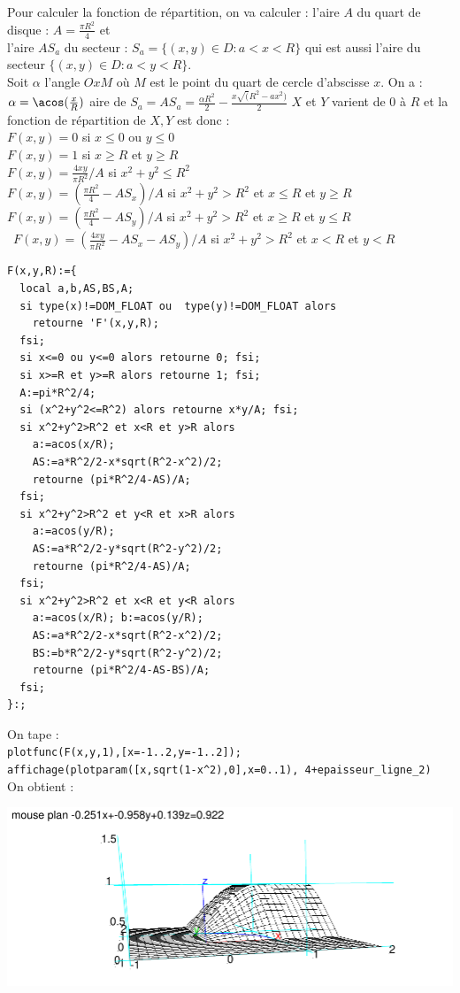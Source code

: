 \documentclass[a4paper,11pt]{book}
\begin{document}
Pour calculer la fonction de r\'epartition, on va calculer :
 l'aire $A$ du quart de disque : $A=\frac{\pi R^2}{4}$ et\\
l'aire $AS_a$ du secteur :
$S_a=\{(x,y)\in D : a<x<R\}$ qui est aussi l'aire du secteur 
$\{(x,y)\in D : a<y<R\}$.\\
Soit $\alpha$ l'angle $OxM$ o\`u $M$ est le point du quart de cercle d'abscisse 
$x$. 
On a :
 $\alpha=\acos(\frac{x}{R})$
 aire de $S_a=AS_a=\frac{\alpha R^2}{2}-\frac{x\sqrt(R^2-ax^2)}{2}$
$X$ et $Y$ varient de 0 \`a $R$ et la fonction de r\'epartition de $X,Y$ est 
donc :\\
$F(x,y)=0$ si $x\leq 0$ ou $y\leq 0$\\ 
$F(x,y)=1$ si $x\geq R$ et $y\geq R$\\ 
$F(x,y)=\frac{4xy}{\pi R^2}/A$ si $x^2+y^2\leq R^2$ \\ 
$F(x,y)=(\frac{\pi R^2}{4}-AS_x)/A$ si $x^2+y^2> R^2$ et $x\leq R$ et $y\geq R$\\ 
$F(x,y)=(\frac{\pi R^2}{4}-AS_y)/A$ si $x^2+y^2> R^2$ et $x\geq R$ et $y\leq R$\\\ 
$F(x,y)=(\frac{4xy}{\pi R^2}-AS_x-AS_y)/A$ si $x^2+y^2> R^2$ et $x<R$ et $y<R$
\begin{verbatim}
F(x,y,R):={
  local a,b,AS,BS,A;
  si type(x)!=DOM_FLOAT ou  type(y)!=DOM_FLOAT alors 
    retourne 'F'(x,y,R); 
  fsi;
  si x<=0 ou y<=0 alors retourne 0; fsi;
  si x>=R et y>=R alors retourne 1; fsi;
  A:=pi*R^2/4;
  si (x^2+y^2<=R^2) alors retourne x*y/A; fsi;
  si x^2+y^2>R^2 et x<R et y>R alors 
    a:=acos(x/R); 
    AS:=a*R^2/2-x*sqrt(R^2-x^2)/2;
    retourne (pi*R^2/4-AS)/A; 
  fsi;
  si x^2+y^2>R^2 et y<R et x>R alors 
    a:=acos(y/R); 
    AS:=a*R^2/2-y*sqrt(R^2-y^2)/2;
    retourne (pi*R^2/4-AS)/A; 
  fsi;
  si x^2+y^2>R^2 et x<R et y<R alors 
    a:=acos(x/R); b:=acos(y/R); 
    AS:=a*R^2/2-x*sqrt(R^2-x^2)/2;
    BS:=b*R^2/2-y*sqrt(R^2-y^2)/2;
    retourne (pi*R^2/4-AS-BS)/A; 
  fsi;
}:;
\end{verbatim}
On tape :\\
{\tt plotfunc(F(x,y,1),[x=-1..2,y=-1..2]);}\\
{\tt affichage(plotparam([x,sqrt(1-x\verb|^|2),0],x=0..1),
4+epaisseur\_ligne\_2)}\\
On obtient :
\begin{center}\includegraphics[width=\textwidth]{uniforme}\end{center}
\end{document}
